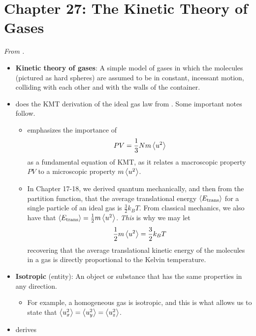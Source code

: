 \documentclass[../notes.tex]{subfiles}
\begin{document}
\section{Chapter 27: The Kinetic Theory of Gases}
\emph{From \textcite{bib:McQuarrieSimon}.}
\begin{itemize}
    \item {}\textbf{Kinetic theory of gases}: A simple model of gases in which the molecules (pictured as hard spheres) are assumed to be in constant, incessant motion, colliding with each other and with the walls of the container.
    \item \textcite{bib:McQuarrieSimon} does the KMT derivation of the ideal gas law from \textcite{bib:APChemNotes}. Some important notes follow.
    \begin{itemize}
        \item \textcite{bib:McQuarrieSimon} emphasizes the importance of
        \begin{equation*}
            PV = \frac{1}{3}Nm\left\langle{u^2}\right\rangle
        \end{equation*}
        as a fundamental equation of KMT, as it relates a macroscopic property $PV$ to a microscopic property $m\left\langle{u^2}\right\rangle$.
        \item In Chapter 17-18, we derived quantum mechanically, and then from the partition function, that the average translational energy $\left\langle{E_\text{trans}}\right\rangle$ for a single particle of an ideal gas is $\frac{3}{2}k_BT$. From classical mechanics, we also have that $\left\langle{E_\text{trans}}\right\rangle=\frac{1}{2}m\left\langle{u^2}\right\rangle$. \emph{This} is why we may let
        \begin{equation*}
            \frac{1}{2}m\left\langle{u^2}\right\rangle = \frac{3}{2}k_BT
        \end{equation*}
        recovering that the average translational kinetic energy of the molecules in a gas is directly proportional to the Kelvin temperature.
    \end{itemize}
    \item \textbf{Isotropic} (entity): An object or substance that has the same properties in any direction.
    \begin{itemize}
        \item For example, a homogeneous gas is isotropic, and this is what allows us to state that $\left\langle{u_x^2}\right\rangle=\left\langle{u_y^2}\right\rangle=\left\langle{u_z^2}\right\rangle$.
    \end{itemize}
    \item \textcite{bib:McQuarrieSimon} derives
    \begin{equation*}

\end{equation*}
\end{itemize}
\end{document}
